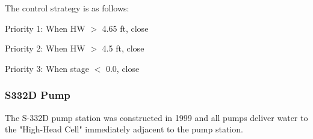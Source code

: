 The control strategy is as follows:
\begin{packed_items}
\item Priority 1: When HW $>$ 4.65 ft, close
\item Priority 2: When HW $>$ 4.5 ft, close
\item Priority 3: When stage $<$ 0.0, close
\end{packed_items}



%
%



\clearpage
\subsubsection{S332D Pump}
The S-332D pump station was constructed in 1999 and all pumps deliver water to the "High-Head Cell" immediately adjacent to the pump station.

